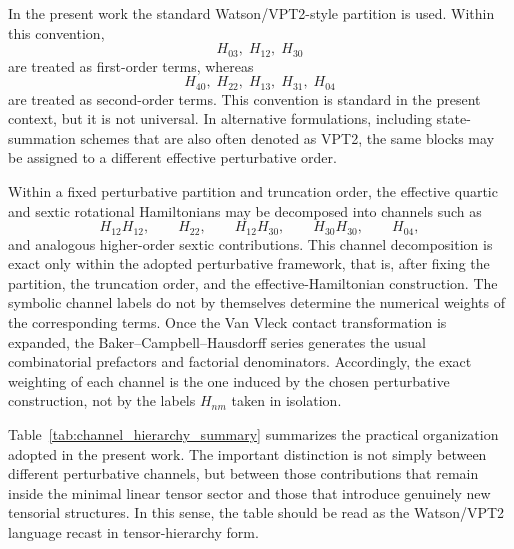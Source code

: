 \documentclass[aip,jcp,reprint,floatfix]{revtex4-2}
\begin{document}
In the present work the standard Watson/VPT2-style partition is used.
Within this convention,
\begin{equation}
H_{03},\; H_{12},\; H_{30}
\end{equation}
are treated as first-order terms, whereas
\begin{equation}
H_{40},\; H_{22},\; H_{13},\; H_{31},\; H_{04}
\end{equation}
are treated as second-order terms. This convention is standard in the
present context, but it is not universal. In alternative formulations,
including state-summation schemes that are also often denoted as VPT2,
the same blocks may be assigned to a different effective perturbative
order.\cite{Franke2023}

Within a fixed perturbative partition and truncation order, the
effective quartic and sextic rotational Hamiltonians may be decomposed
into channels such as
\begin{equation}
H_{12}H_{12},\qquad H_{22},\qquad H_{12}H_{30},\qquad
H_{30}H_{30},\qquad H_{04},
\end{equation}
and analogous higher-order sextic contributions. This channel
decomposition is exact only within the adopted perturbative framework,
that is, after fixing the partition, the truncation order, and the
effective-Hamiltonian construction. The symbolic channel labels do not
by themselves determine the numerical weights of the corresponding
terms. Once the Van Vleck contact transformation is expanded, the
Baker--Campbell--Hausdorff series generates the usual combinatorial
prefactors and factorial denominators. Accordingly, the exact
weighting of each channel is the one induced by the chosen
perturbative construction, not by the labels $H_{nm}$ taken in
isolation.

Table~\ref{tab:channel_hierarchy_summary} summarizes the practical
organization adopted in the present work. The important distinction is
not simply between different perturbative channels, but between those
contributions that remain inside the minimal linear tensor sector and
those that introduce genuinely new tensorial structures. In this
sense, the table should be read as the Watson/VPT2 language recast in
tensor-hierarchy form.\cite{Watson1968,Watson1977,Mills1972}
\end{document}
